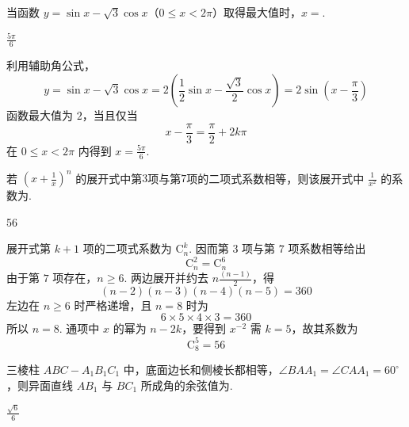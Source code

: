 \begin{problem}
当函数 \(y = \sin x - \sqrt{3}\cos x\)（\(0 \leqslant x < 2\pi\)）取得最大值时，\(x =\)\fillinblank{}.
\end{problem}

\begin{answer}
\(\frac{5\pi}{6}\)
\end{answer}

\begin{solution}
利用辅助角公式，
\[
y=\sin x-\sqrt3\cos x
=2\left(\frac12\sin x-\frac{\sqrt3}{2}\cos x\right)
=2\sin\left(x-\frac\pi3\right)
\]
函数最大值为 \(2\)，当且仅当
\[
x-\frac\pi3=\frac\pi2+2k\pi
\]
在 \(0\leqslant x<2\pi\) 内得到 \(x=\frac{5\pi}{6}\).
\end{solution}

\begin{problem}
若 \(\left(x + \frac{1}{x}\right)^n\) 的展开式中第\(3\)项与第\(7\)项的二项式系数相等，则该展开式中 \(\frac{1}{x^2}\) 的系数为\fillinblank{}.
\end{problem}

\begin{answer}
56
\end{answer}

\begin{solution}
展开式第 \(k+1\) 项的二项式系数为 \(\mathrm C_n^k\). 因而第 \(3\) 项与第 \(7\) 项系数相等给出
\[
\mathrm C_n^2=\mathrm C_n^6
\]
由于第 \(7\) 项存在，\(n\geqslant6\). 两边展开并约去 \(n\frac{(n-1)}{2}\)，得
\[
(n-2)(n-3)(n-4)(n-5)=360
\]
左边在 \(n\geqslant6\) 时严格递增，且 \(n=8\) 时为
\[
6\times5\times4\times3=360
\]
所以 \(n=8\). 通项中 \(x\) 的幂为 \(n-2k\)，要得到 \(x^{-2}\) 需 \(k=5\)，故其系数为
\[
\mathrm C_8^5=56
\]
\end{solution}

\begin{problem}
三棱柱 \(ABC - A_{1}B_{1}C_{1}\) 中，底面边长和侧棱长都相等，\(\angle BAA_{1} = \angle CAA_{1} = 60^{\circ}\)，则异面直线 \(AB_{1}\) 与 \(BC_{1}\) 所成角的余弦值为\fillinblank{}.
\end{problem}

\begin{answer}
\(\frac{\sqrt{6}}{6}\)
\end{answer}

